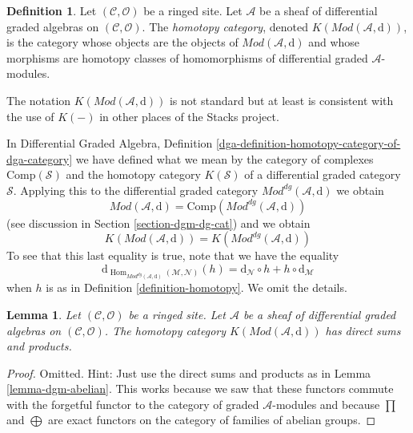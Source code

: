 \documentclass{stacks-project}
\theoremstyle{plain}
\newtheorem{lemma}[subsection]{Lemma}
\theoremstyle{definition}
\newtheorem{definition}[subsection]{Definition}
\theoremstyle{remark}
\numberwithin{equation}{subsection}
\def\Hom{\mathop{\mathrm{Hom}}\nolimits}
\begin{document}
\begin{definition}
\label{definition-complexes-notation}
Let $(\mathcal{C}, \mathcal{O})$ be a ringed site.
Let $\mathcal{A}$ be a sheaf of differential graded algebras
on $(\mathcal{C}, \mathcal{O})$.
The {\it homotopy category}, denoted $K(\textit{Mod}(\mathcal{A}, \text{d}))$,
is the category whose objects are the objects of
$\textit{Mod}(\mathcal{A}, \text{d})$ and whose morphisms are homotopy classes
of homomorphisms of differential graded $\mathcal{A}$-modules.
\end{definition}

\noindent
The notation $K(\textit{Mod}(\mathcal{A}, \text{d}))$
is not standard but at least is
consistent with the use of $K(-)$ in other places of the Stacks project.

\medskip\noindent
In Differential Graded Algebra, Definition
\ref{dga-definition-homotopy-category-of-dga-category}
we have defined what we mean by the category of complexes
$\text{Comp}(\mathcal{S})$
and the homotopy category $K(\mathcal{S})$
of a differential graded category $\mathcal{S}$.
Applying this to the differential graded category
$\textit{Mod}^{dg}(\mathcal{A}, \text{d})$ we obtain
$$
\textit{Mod}(\mathcal{A}, \text{d}) =
\text{Comp}(\textit{Mod}^{dg}(\mathcal{A}, \text{d}))
$$
(see discussion in Section \ref{section-dgm-dg-cat}) and we obtain
$$
K(\textit{Mod}(\mathcal{A}, \text{d})) =
K(\textit{Mod}^{dg}(\mathcal{A}, \text{d}))
$$
To see that this last equality is true, note that we have the equality
$$
\text{d}_{\Hom_{\textit{Mod}^{dg}(\mathcal{A}, \text{d})}
(\mathcal{M}, \mathcal{N})}(h) =
\text{d}_\mathcal{N} \circ h + h \circ \text{d}_\mathcal{M}
$$
when $h$ is as in Definition \ref{definition-homotopy}. We omit the
details.

\begin{lemma}
\label{lemma-homotopy-direct-sums}
Let $(\mathcal{C}, \mathcal{O})$ be a ringed site.
Let $\mathcal{A}$ be a sheaf of differential graded algebras
on $(\mathcal{C}, \mathcal{O})$.
The homotopy category $K(\textit{Mod}(\mathcal{A}, \text{d}))$
has direct sums and products.
\end{lemma}

\begin{proof}
Omitted. Hint: Just use the direct sums and products as in
Lemma \ref{lemma-dgm-abelian}. This works because we saw that
these functors commute with the forgetful functor to the category
of graded $\mathcal{A}$-modules and because $\prod$ and $\bigoplus$
are exact functors on the category of families of abelian groups.
\end{proof}
\end{document}
